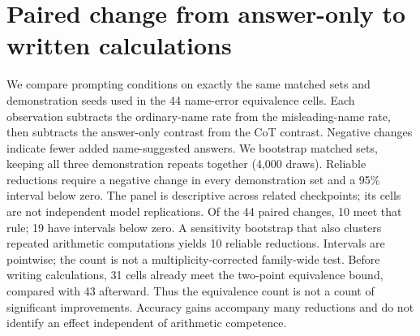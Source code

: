 \section{Paired change from answer-only to written calculations}
\label{a-app:round7-paired}
We compare prompting conditions on exactly the same matched sets and demonstration seeds used in the 44 name-error equivalence cells. Each observation subtracts the ordinary-name rate from the misleading-name rate, then subtracts the answer-only contrast from the CoT contrast. Negative changes indicate fewer added name-suggested answers. We bootstrap matched sets, keeping all three demonstration repeats together (4,000 draws). Reliable reductions require a negative change in every demonstration set and a 95\% interval below zero. The panel is descriptive across related checkpoints; its cells are not independent model replications.
Of the 44 paired changes, 10 meet that rule; 19 have intervals below zero. A sensitivity bootstrap that also clusters repeated arithmetic computations yields 10 reliable reductions. Intervals are pointwise; the count is not a multiplicity-corrected family-wide test. Before writing calculations, 31 cells already meet the two-point equivalence bound, compared with 43 afterward. Thus the equivalence count is not a count of significant improvements. Accuracy gains accompany many reductions and do not identify an effect independent of arithmetic competence.

